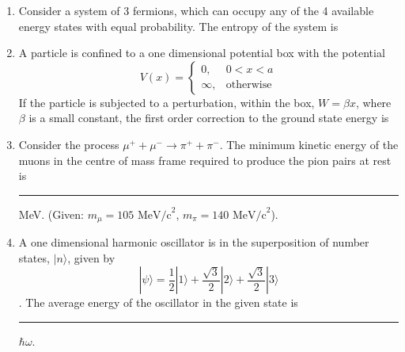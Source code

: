 \documentclass[journal,12pt,onecolumn]{IEEEtran}
\theoremstyle{remark}
\begin{document}
\begin{enumerate}
\item Consider a system of 3 fermions, which can occupy any of the 4 available energy states with equal probability. The entropy of the system is
\hfill{} \begin{enumerate}  \end{enumerate}

\item A particle is confined to a one dimensional potential box with the potential
\[ V(x) = \begin{cases} 0, & 0 < x < a \\ \infty, & \text{otherwise} \end{cases} \]
If the particle is subjected to a perturbation, within the box, $W = \beta x$, where $\beta$ is a small constant, the first order correction to the ground state energy is
\hfill{} \begin{enumerate}  \end{enumerate}

\item Consider the process $\mu^+ + \mu^- \rightarrow \pi^+ + \pi^-$. The minimum kinetic energy of the muons \brak{\mu} in the centre of mass frame required to produce the pion \brak{\pi} pairs at rest is \rule{3cm}{0.4pt} MeV. (Given: $m_\mu = 105 \text{ MeV/c}^2$, $m_\pi = 140 \text{ MeV/c}^2$).\hfill{}

\item A one dimensional harmonic oscillator is in the superposition of number states, $|n\rangle$, given by $$|\psi\rangle = \frac{1}{2}|1\rangle + \frac{\sqrt{3}}{2}|2\rangle + \frac{\sqrt{3}}{2}|3\rangle$$. The average energy of the oscillator in the given state is \rule{3cm}{0.4pt} $\hbar\omega$.\hfill{}


\end{enumerate}
\end{document}
